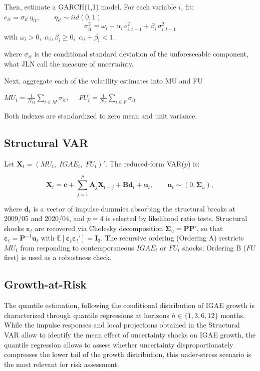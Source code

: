 \documentclass[12pt]{article}
\begin{document}
Then, estimate a GARCH(1,1) model. For each variable $i$, fit: $e_{it} = \sigma_{it}\,\eta_{it}, \qquad \eta_{it} \sim \mathit{iid}(0,1)$
\[
\sigma^2_{it} = \omega_i + \alpha_i\,e^2_{i,t-1} + \beta_i\,\sigma^2_{i,t-1}
\]
with $\omega_i > 0$,\ $\alpha_i, \beta_i \geq 0$,\ $\alpha_i + \beta_i < 1$.

where 
$\sigma_{it}$ is the conditional standard deviation of the unforeseeable component, what JLN call the measure of uncertainty.

Next, aggregate each of the volatility estimates into MU and FU

$MU_t = \frac{1}{N_{{M}}}\sum_{i \in {M}} \sigma_{it}, \quad$
$FU_t = \frac{1}{N_{{F}}}\sum_{i \in {F}} \sigma_{it}$

Both indexes are standardized to zero mean and unit variance.

\subsection*{Structural VAR}

Let $\mathbf{X}_t = (MU_t,\; IGAE_t,\; FU_t)'$. The reduced-form VAR($p$) is:

\begin{equation}\label{eq:var}
  \mathbf{X}_t = \mathbf{c} + \sum_{j=1}^{p} \mathbf{A}_j \mathbf{X}_{t-j}
                + \mathbf{B}\mathbf{d}_t + \mathbf{u}_t,
  \qquad \mathbf{u}_t \sim (0, \boldsymbol{\Sigma}_u),
\end{equation}

\noindent where $\mathbf{d}_t$ is a vector of impulse dummies absorbing the
structural breaks at 2009/05 and 2020/04, and $p = 4$ is selected by
likelihood ratio tests. Structural shocks $\boldsymbol{\varepsilon}_t$ are
recovered via Cholesky decomposition
$\boldsymbol{\Sigma}_u = \mathbf{P}\mathbf{P}'$, so that
$\boldsymbol{\varepsilon}_t = \mathbf{P}^{-1}\mathbf{u}_t$ with
$\mathbb{E}[\boldsymbol{\varepsilon}_t \boldsymbol{\varepsilon}_t'] =
\mathbf{I}_3$. The recursive ordering (Ordering A) restricts $MU_t$ from
responding to contemporaneous $IGAE_t$ or $FU_t$ shocks; Ordering B
($FU$ first) is used as a robustness check.


\subsection*{Growth-at-Risk}
The quantile estimation, following \cite{adrian2019vulnerable} the conditional distribution of IGAE growth is characterized through quantile regressions at horizons $h \in \{1,3,6,12\}$ months. While the impulse responses and local projections obtained in the Structural VAR allow to identify the mean effect of uncertainty shocks on IGAE growth, the quantile regression allows to assess whether uncertainty 
disproportionately compresses the lower tail of the growth distribution, this under-stress scenario is the most relevant for risk assessment.
\end{document}

